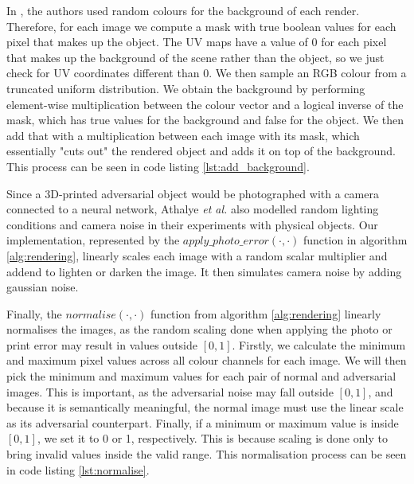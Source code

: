 

In \cite{athalye}, the authors used random colours for the background of each render. Therefore, for each image we compute a mask with true boolean values for each pixel that makes up the object. The UV maps have a value of 0 for each pixel that makes up the background of the scene rather than the object, so we just check for UV coordinates different than 0. We then sample an RGB colour from a truncated uniform distribution. We obtain the background by performing element-wise multiplication between the colour vector and a logical inverse of the mask, which has true values for the background and false for the object. We then add that with a multiplication between each image with its mask, which essentially "cuts out" the rendered object and adds it on top of the background. This process can be seen in code listing \ref{lst:add_background}.

Since a 3D-printed adversarial object would be photographed with a camera connected to a neural network, Athalye \textit{et al.} \cite{athalye} also modelled random lighting conditions and camera noise in their experiments with physical objects. Our implementation, represented by the $apply\_photo\_error(\cdot, \cdot)$ function in algorithm \ref{alg:rendering}, linearly scales each image with a random scalar multiplier and addend to lighten or darken the image. It then simulates camera noise by adding gaussian noise.



Finally, the $normalise(\cdot, \cdot)$ function from algorithm \ref{alg:rendering} linearly normalises the images, as the random scaling done when applying the photo or print error may result in values outside $[0, 1]$. Firstly, we calculate the minimum and maximum pixel values across all colour channels for each image. We will then pick the minimum and maximum values for each pair of normal and adversarial images. This is important, as the adversarial noise may fall outside $[0, 1]$, and because it is semantically meaningful, the normal image must use the linear scale as its adversarial counterpart. Finally, if a minimum or maximum value is inside $[0, 1]$, we set it to 0 or 1, respectively. This is because scaling is done only to bring invalid values inside the valid range. This normalisation process can be seen in code listing \ref{lst:normalise}.

